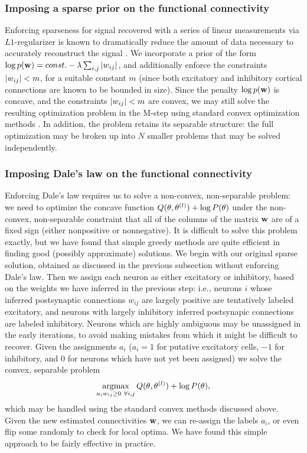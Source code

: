 \subsubsection{Imposing a sparse prior on the functional connectivity}

Enforcing sparseness for signal recovered with a series of linear
measurements via $L1$-regularizer is known to dramatically reduce the
amount of data necessary to accurately reconstruct the signal
\cite{Tibs96,TIP01,DE03,NG04,Candes2005,Mishchenko2009}.  We
incorporate a prior of the form $\log p(\mathbf{w}) = const. - \lambda
\sum_{i,j} |w_{ij}|$, and additionally enforce the constraints
$|w_{ij}|<m$, for a suitable constant $m$ (since both excitatory and
inhibitory cortical connections are known to be bounded in size).
Since the penalty $\log p(\mathbf{w})$ is concave, and the constraints
$|w_{ij}|<m$ are convex, we may still solve the resulting
optimization problem in the M-step using standard convex optimization
methods \cite{CONV04}.  In addition, the problem retains its separable
structure: the full optimization may be broken up into $N$ smaller
problems that may be solved independently.

\subsubsection{Imposing Dale's law on the functional connectivity}

Enforcing Dale's law requires us to solve a non-convex, non-separable
problem: we need to optimize the concave function $Q(\mathbf{\theta},\mathbf{\theta}^{(l)})
+ \log P(\theta)$ under the non-convex, non-separable constraint that
all of the columns of the matrix $\mathbf{w}$ are of a fixed sign (either
nonpositive or nonnegative).  It is difficult to solve this problem
exactly, but we have found that simple greedy methods are quite
efficient in finding good (possibly approximate) solutions.  We begin
with our original sparse solution, obtained as discussed in the
previous subsection without enforcing Dale's law.  Then we assign each
neuron as either excitatory or inhibitory, based on the weights we
have inferred in the previous step: i.e., neurons $i$ whose inferred
postsynaptic connections $w_{ij}$ are largely positive are tentatively
labeled excitatory, and neurons with largely inhibitory inferred
postsynapic connections are labeled inhibitory.  Neurons which are
highly ambiguous may be unassigned in the early iterations, to avoid
making mistakes from which it might be difficult to recover.  Given
the assignments $a_i$ ($a_i =1$ for putative excitatory cells, $-1$
for inhibitory, and $0$ for neurons which have not yet been assigned)
we solve the convex, separable problem
\begin{equation}
\argmax_{\substack{a_i \w_{ij} \geq 0 ~ \forall i,j}} Q(\bth,\bth^{(l)}) +
\log P(\theta),
\end{equation}
which may be handled using the standard convex methods discussed
above.  Given the new estimated connectivities $\mathbf{w}$, we can re-assign
the labels $a_i$, or even flip some randomly to check for local
optima.  We have found this simple approach to be fairly effective in
practice.


